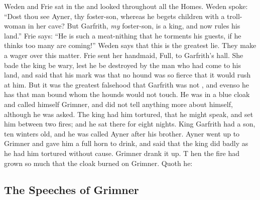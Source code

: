 \bpb Weden and Frie sat in the  and looked throughout all the Homes.
Weden spoke: “Dost thou see Ayner, thy foster-son, whereas he begets children with a troll-woman in her cave?
But Garfrith, \emph{my} foster-son, is a king, and now rules his land.”
Frie says: “He is such a meat-nithing that he torments his guests, if he thinks too many are coming!”
Weden says that this is the greatest lie.  They make a wager over this matter.
Frie sent her handmaid, Full, to Garfrith’s hall. She bade the king be wary, lest he be destroyed by the  man who had come to his land, and said that his mark was that no hound was so fierce that it would rush at him.
But it was the greatest falsehood that Garfrith was not , and evenso he has that man bound whom the hounds would not touch.
He was in a blue cloak and called himself Grimner, and did not tell anything more about himself, although he was asked.
The king had him tortured, that he might speak, and set him between two fires; and he sat there for eight nights.
King Garfrith had a son, ten winters old, and he was called Ayner after his brother.
Ayner went up to Grimner and gave him a full horn to drink, and said that the king did badly as he had him tortured without cause.
Grimner drank it up. T hen the fire had grown so much that the cloak burned on Grimner.  Quoth he:\epb\epg

\newpage

\subsection{The Speeches of Grimner}

